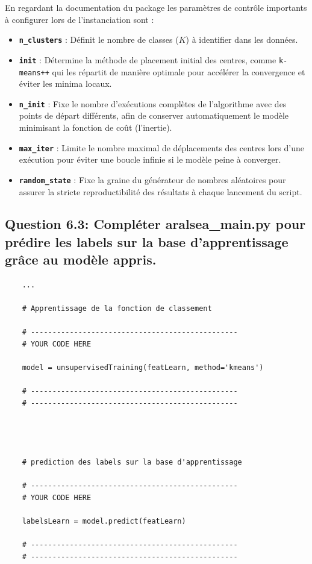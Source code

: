 En regardant la documentation du package les paramètres de contrôle importants à configurer lors de l'instanciation sont :
\begin{itemize}
    \item \textbf{\texttt{n\_clusters}} : Définit le nombre de classes ($K$) à identifier dans les données.
    \item \textbf{\texttt{init}} : Détermine la méthode de placement initial des centres, comme \texttt{k-means++} qui les répartit de manière optimale pour accélérer la convergence et éviter les minima locaux.
    \item \textbf{\texttt{n\_init}} : Fixe le nombre d'exécutions complètes de l'algorithme avec des points de départ différents, afin de conserver automatiquement le modèle minimisant la fonction de coût (l'inertie).
    \item \textbf{\texttt{max\_iter}} : Limite le nombre maximal de déplacements des centres lors d'une exécution pour éviter une boucle infinie si le modèle peine à converger.
    \item \textbf{\texttt{random\_state}} : Fixe la graine du générateur de nombres aléatoires pour assurer la stricte reproductibilité des résultats à chaque lancement du script.
\end{itemize}

\subsection*{Question 6.3: Compléter aralsea\_main.py pour prédire les labels sur la base d’apprentissage grâce au modèle appris.}
\begin{lstlisting}
    ...

    # Apprentissage de la fonction de classement

    # ------------------------------------------------
    # YOUR CODE HERE

    model = unsupervisedTraining(featLearn, method='kmeans')

    # ------------------------------------------------
    # ------------------------------------------------




    # prediction des labels sur la base d'apprentissage

    # ------------------------------------------------
    # YOUR CODE HERE

    labelsLearn = model.predict(featLearn)

    # ------------------------------------------------
    # ------------------------------------------------
\end{lstlisting}

